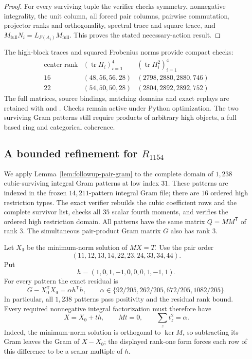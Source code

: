 \begin{proof}
For every surviving tuple the verifier checks symmetry, nonnegative
integrality, the unit column, all forced pair columns, pairwise
commutation, projector ranks and orthogonality, spectral trace and
square trace, and
$M_{\mathrm{full}}N_i=L_{F(A_i)}M_{\mathrm{full}}$.
This proves the stated necessary-action result.
\end{proof}

The high-block traces and squared Frobenius norms provide compact checks:
\[
\begin{array}{c|c|c}
\text{center rank}&(\operatorname{tr}H_i)_{i=1}^4&
 (\operatorname{tr}H_i^2)_{i=1}^4\\\hline
16&(48,56,56,28)&(2798,2880,2880,746)\\
22&(54,50,50,28)&(2804,2892,2892,752)
\end{array}
\]
The full matrices, source bindings, matching domains and exact replays are
retained with  and
.  Checks remain active under Python
optimization.  The two surviving Gram patterns still require products
of arbitrary high objects, a full based ring and categorical coherence.

\subsection{A bounded refinement for \texorpdfstring{$R_{1154}$}{R1154}}
\label{subsec:followup-r1154}

We apply Lemma~\ref{lem:followup-pair-gram} to the complete domain of
$1,238$ cubic-surviving integral Gram patterns at low index $31$.
These patterns are indexed in the frozen $14,211$-pattern integral Gram file;
there are $16$ ordered high restriction types. The exact verifier rebuilds the
cubic coefficient rows and the complete survivor list, checks all $35$ scalar
fourth moments, and verifies the ordered high restriction domain.
All patterns have the same matrix $Q=MM^{\mathsf T}$ of rank $3$.
The simultaneous pair-product Gram matrix $G$ also has rank $3$.

Let $X_0$ be the minimum-norm solution of $MX=T$. Use the pair order
\[ (11,12,13,14,22,23,24,33,34,44). \]
Put
\[
 h=(1,0,1,-1,0,0,0,1,-1,1).
\]
For every pattern the exact residual is
\[
 G-X_0^{\mathsf T}X_0=\alpha h^{\mathsf T}h,
 \qquad
 \alpha\in\{92/205,262/205,672/205,1082/205\}.
\]
In particular, all $1,238$ patterns pass positivity and the residual rank
bound. Every required nonnegative integral factorization must therefore have
\[
 X=X_0+t h,\qquad Mt=0,\qquad \sum_z t_z^2=\alpha.
\]
Indeed, the minimum-norm solution is orthogonal to $\ker M$, so subtracting
its Gram leaves the Gram of $X-X_0$; the displayed rank-one form forces each
row of this difference to be a scalar multiple of $h$.

